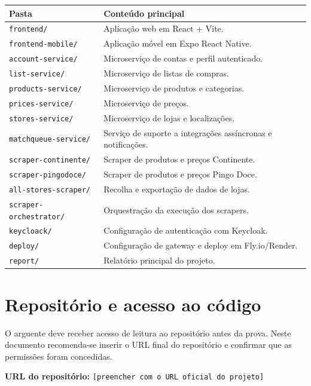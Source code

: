 \documentclass[a4paper,11pt]{article}
\begin{document}
\begin{longtable}{>{\raggedright\arraybackslash}p{4.2cm} >{\raggedright\arraybackslash}p{9.8cm}}
\textbf{Pasta} & \textbf{Conte\'udo principal} \\
\hline
\texttt{frontend/} & Aplica\c{c}\~ao web em React + Vite. \\
\texttt{frontend-mobile/} & Aplica\c{c}\~ao m\'ovel em Expo React Native. \\
\texttt{account-service/} & Microservi\c{c}o de contas e perfil autenticado. \\
\texttt{list-service/} & Microservi\c{c}o de listas de compras. \\
\texttt{products-service/} & Microservi\c{c}o de produtos e categorias. \\
\texttt{prices-service/} & Microservi\c{c}o de pre\c{c}os. \\
\texttt{stores-service/} & Microservi\c{c}o de lojas e localiza\c{c}\~oes. \\
\texttt{matchqueue-service/} & Servi\c{c}o de suporte a integra\c{c}\~oes ass\'incronas e notifica\c{c}\~oes. \\
\texttt{scraper-continente/} & Scraper de produtos e pre\c{c}os Continente. \\
\texttt{scraper-pingodoce/} & Scraper de produtos e pre\c{c}os Pingo Doce. \\
\texttt{all-stores-scraper/} & Recolha e exporta\c{c}\~ao de dados de lojas. \\
\texttt{scraper-orchestrator/} & Orquestra\c{c}\~ao da execu\c{c}\~ao dos scrapers. \\
\texttt{keycloack/} & Configura\c{c}\~ao de autentica\c{c}\~ao com Keycloak. \\
\texttt{deploy/} & Configura\c{c}\~ao de gateway e deploy em Fly.io/Render. \\
\texttt{report/} & Relat\'orio principal do projeto. \\
\end{longtable}

\section{Reposit\'orio e acesso ao c\'odigo}

O arguente deve receber acesso de leitura ao reposit\'orio antes da prova. Neste documento recomenda-se inserir o URL final do reposit\'orio e confirmar que as permiss\~oes foram concedidas.

\textbf{URL do reposit\'orio:} \texttt{[preencher com o URL oficial do projeto]}
\end{document}
